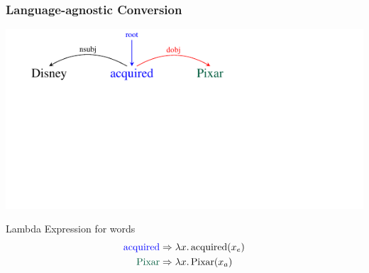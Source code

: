 \documentclass[mathserif,12pt]{beamer}
\newcommand{\lspace}{.\,}
\begin{document}
\begin{frame}[noframenumbering]
\frametitle{Language-agnostic Conversion}
\vspace{-2.4em}
\begin{center}
\includegraphics[trim=2em 9.4em 10em 0em,clip=true,scale=1.3]{figures/pixar_dobj}

\end{center}

\vspace{1cm}

\begin{block}{\centering Lambda Expression for words}
\vspace{-0.5cm}
\begin{align*}
  \hbox{\color{blue} acquired} & \Rightarrow  \lambda x \lspace \hbox{acquired}(x_e)  \\
  \hbox{\color{blue!40!green!60!black} Pixar} & \Rightarrow  \lambda x \lspace \hbox{Pixar}(x_a) 
\end{align*}
\vspace{-0.5cm}
\end{block}
\end{frame}
\end{document}

